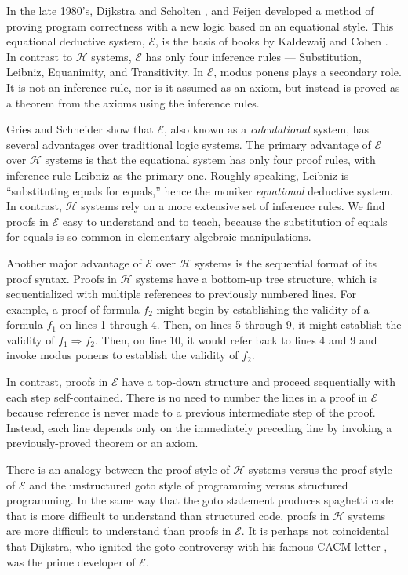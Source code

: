 \documentclass[12pt, fleqn, leqno]{article}
\newcommand{\impl}{\ensuremath{\Rightarrow}}        %
\begin{document}
In the late 1980's, Dijkstra and Scholten \cite{DandS}, and Feijen \cite{Feij} developed a method of proving program correctness with a new logic based on an equational style.
This equational deductive system, $\mathcal{E}$, is the basis of books by Kaldewaij \cite{Kald} and Cohen \cite{Cohen}.
In contrast to $\mathcal{H}$ systems, $\mathcal{E}$ has only four inference rules --- Substitution, Leibniz, Equanimity, and Transitivity.
In $\mathcal{E}$, modus ponens plays a secondary role.
It is not an inference rule, nor is it assumed as an axiom, but instead is proved as a theorem from the axioms using the inference rules.

Gries and Schneider \cite{Gries1995, Gries1995145} show that $\mathcal{E}$, also known as a \textit{calculational} system, has several advantages over traditional logic systems.
The primary advantage of $\mathcal{E}$ over $\mathcal{H}$ systems is that the equational system has only four proof rules, with inference rule Leibniz as the primary one.
Roughly speaking, Leibniz is ``substituting equals for equals,'' hence the moniker \textit{equational} deductive system.
In contrast, $\mathcal{H}$ systems rely on a more extensive set of inference rules.
We find proofs in $\mathcal{E}$ easy to understand and to teach, because the substitution of equals for equals is so common in elementary algebraic manipulations.

Another major advantage of $\mathcal{E}$ over $\mathcal{H}$ systems is the sequential format of its proof syntax.
Proofs in $\mathcal{H}$ systems have a bottom-up tree structure, which is sequentialized with multiple references to previously numbered lines.
For example, a proof of formula $f_2$ might begin by establishing the validity  of a formula $f_1$ on lines 1 through 4.
Then, on lines 5 through 9, it might establish the validity of $f_1\impl f_2$.
Then, on line 10, it would refer back to lines 4 and 9 and invoke modus ponens to establish the validity of $f_2$.

In contrast, proofs in $\mathcal{E}$ have a top-down structure and proceed sequentially with each step self-contained.
There is no need to number the lines in a proof in $\mathcal{E}$ because reference is never made to a previous intermediate step of the proof.
Instead, each line depends only on the immediately preceding line by invoking a previously-proved theorem or an axiom.

There is an analogy between the proof style of $\mathcal{H}$ systems versus the proof style of $\mathcal{E}$ and the unstructured goto style of programming versus structured programming.
In the same way that the goto statement produces spaghetti code that is more difficult to understand than structured code, proofs in $\mathcal{H}$ systems are more difficult to understand than proofs in $\mathcal{E}$.
It is perhaps not coincidental that Dijkstra, who ignited the goto controversy with his famous CACM letter \cite{Dijkstra:1968:LEG:362929.362947}, was the prime developer of $\mathcal{E}$.
\end{document}
